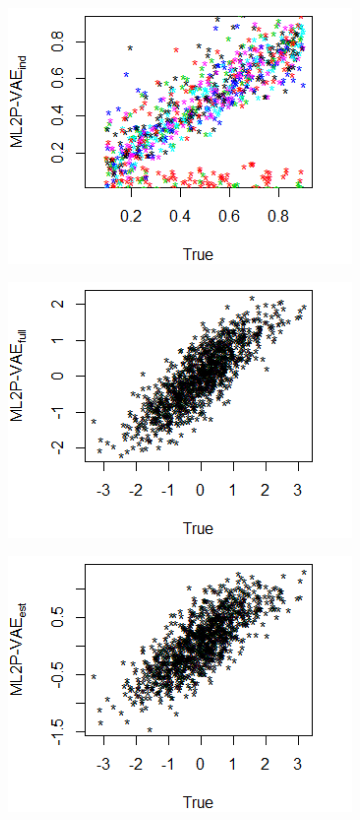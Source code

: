 \begin{figure}[h]
\begin{subfigure}{.32\textwidth}
    \end{subfigure}
    \begin{subfigure}{.32\textwidth}
      \centering
      \includegraphics[width=.9\linewidth]{img/ml_journal_results/20skills/vae_ind_disc_20skills.png}
    \end{subfigure}
    \begin{subfigure}{.32\textwidth}
      \centering
      \includegraphics[width=.9\linewidth]{img/ml_journal_results/20skills/vae_full_theta_20skills.png}
    \end{subfigure}
    \begin{subfigure}{.32\textwidth}
      \centering
      \includegraphics[width=.9\linewidth]{img/ml_journal_results/20skills/vae_est_theta_20skills.png}

\end{subfigure}
\end{figure}
